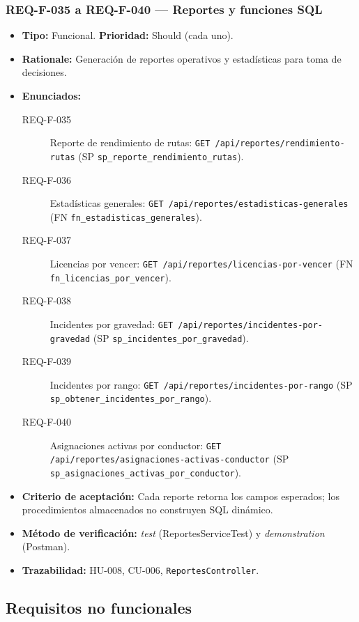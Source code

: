 \documentclass[12pt,a4paper]{article}
\begin{document}
\subsubsection{REQ-F-035 a REQ-F-040 — Reportes y funciones SQL}
\begin{itemize}
  \item \textbf{Tipo:} Funcional. \textbf{Prioridad:} Should (cada uno).
  \item \textbf{Rationale:} Generación de reportes operativos y estadísticas para toma de
  decisiones.
  \item \textbf{Enunciados:}
    \begin{description}
      \item[REQ-F-035] Reporte de rendimiento de rutas: \texttt{GET /api/reportes/rendimiento-rutas}
      (SP \texttt{sp\_reporte\_rendimiento\_rutas}).
      \item[REQ-F-036] Estadísticas generales: \texttt{GET /api/reportes/estadisticas-generales}
      (FN \texttt{fn\_estadisticas\_generales}).
      \item[REQ-F-037] Licencias por vencer: \texttt{GET /api/reportes/licencias-por-vencer}
      (FN \texttt{fn\_licencias\_por\_vencer}).
      \item[REQ-F-038] Incidentes por gravedad: \texttt{GET /api/reportes/incidentes-por-gravedad}
      (SP \texttt{sp\_incidentes\_por\_gravedad}).
      \item[REQ-F-039] Incidentes por rango: \texttt{GET /api/reportes/incidentes-por-rango}
      (SP \texttt{sp\_obtener\_incidentes\_por\_rango}).
      \item[REQ-F-040] Asignaciones activas por conductor:
      \texttt{GET /api/reportes/asignaciones-activas-conductor}
      (SP \texttt{sp\_asignaciones\_activas\_por\_conductor}).
    \end{description}
  \item \textbf{Criterio de aceptación:} Cada reporte retorna los campos esperados; los
  procedimientos almacenados no construyen SQL dinámico.
  \item \textbf{Método de verificación:} \textit{test} (ReportesServiceTest) y
  \textit{demonstration} (Postman).
  \item \textbf{Trazabilidad:} HU-008, CU-006, \texttt{ReportesController}.
\end{itemize}

\subsection{Requisitos no funcionales}
\label{sec:rnf}
\end{document}
